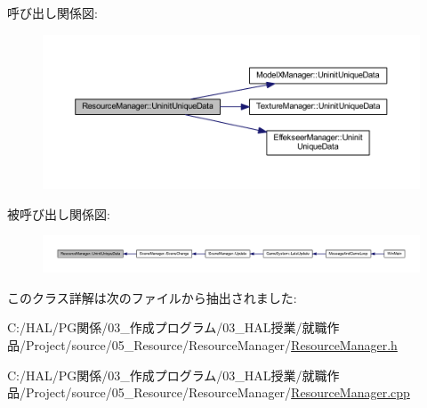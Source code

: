 呼び出し関係図\+:
\nopagebreak
\begin{figure}[H]
\begin{center}
\leavevmode
\includegraphics[width=350pt]{class_resource_manager_abcb135906cb991a49ec6e8c8db057de1_cgraph}
\end{center}
\end{figure}
被呼び出し関係図\+:
\nopagebreak
\begin{figure}[H]
\begin{center}
\leavevmode
\includegraphics[width=350pt]{class_resource_manager_abcb135906cb991a49ec6e8c8db057de1_icgraph}
\end{center}
\end{figure}


このクラス詳解は次のファイルから抽出されました\+:\begin{DoxyCompactItemize}
\item 
C\+:/\+H\+A\+L/\+P\+G関係/03\+\_\+作成プログラム/03\+\_\+\+H\+A\+L授業/就職作品/\+Project/source/05\+\_\+\+Resource/\+Resource\+Manager/\mbox{\hyperlink{_resource_manager_8h}{Resource\+Manager.\+h}}\item 
C\+:/\+H\+A\+L/\+P\+G関係/03\+\_\+作成プログラム/03\+\_\+\+H\+A\+L授業/就職作品/\+Project/source/05\+\_\+\+Resource/\+Resource\+Manager/\mbox{\hyperlink{_resource_manager_8cpp}{Resource\+Manager.\+cpp}}\end{DoxyCompactItemize}
